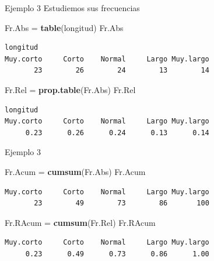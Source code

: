 \documentclass[
  ignorenonframetext,
  aspectratio=169]{beamer}
\newenvironment{Shaded}{\begin{snugshade}}{\end{snugshade}}
\newcommand{\FunctionTok}[1]{\textcolor[rgb]{0.13,0.29,0.53}{\textbf{#1}}}
\newcommand{\NormalTok}[1]{#1}
\newcommand{\OtherTok}[1]{\textcolor[rgb]{0.56,0.35,0.01}{#1}}
\begin{document}
\begin{frame}[fragile]{Ejemplo 3}
\label{ejemplo-3-2}
Estudiemos sus frecuencias

\begin{Shaded}
\begin{Highlighting}[]
\NormalTok{Fr.Abs }\OtherTok{=} \FunctionTok{table}\NormalTok{(longitud)}
\NormalTok{Fr.Abs}
\end{Highlighting}
\end{Shaded}

\begin{verbatim}
longitud
Muy.corto     Corto    Normal     Largo Muy.largo 
       23        26        24        13        14 
\end{verbatim}

\begin{Shaded}
\begin{Highlighting}[]
\NormalTok{Fr.Rel }\OtherTok{=} \FunctionTok{prop.table}\NormalTok{(Fr.Abs)}
\NormalTok{Fr.Rel}
\end{Highlighting}
\end{Shaded}

\begin{verbatim}
longitud
Muy.corto     Corto    Normal     Largo Muy.largo 
     0.23      0.26      0.24      0.13      0.14 
\end{verbatim}
\end{frame}

\begin{frame}[fragile]{Ejemplo 3}
\label{ejemplo-3-3}
\begin{Shaded}
\begin{Highlighting}[]
\NormalTok{Fr.Acum }\OtherTok{=} \FunctionTok{cumsum}\NormalTok{(Fr.Abs)}
\NormalTok{Fr.Acum}
\end{Highlighting}
\end{Shaded}

\begin{verbatim}
Muy.corto     Corto    Normal     Largo Muy.largo 
       23        49        73        86       100 
\end{verbatim}

\begin{Shaded}
\begin{Highlighting}[]
\NormalTok{Fr.RAcum }\OtherTok{=} \FunctionTok{cumsum}\NormalTok{(Fr.Rel)}
\NormalTok{Fr.RAcum}
\end{Highlighting}
\end{Shaded}

\begin{verbatim}
Muy.corto     Corto    Normal     Largo Muy.largo 
     0.23      0.49      0.73      0.86      1.00 
\end{verbatim}
\end{frame}
\end{document}
